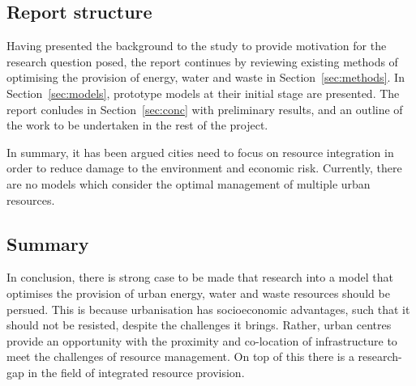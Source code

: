 \subsection{Report structure}
Having presented the background to the study to provide motivation for the research question posed, the report continues by reviewing existing methods of optimising the provision of energy, water and waste in Section~\ref{sec:methods}. In Section~\ref{sec:models}, prototype models at their initial stage are presented. The report conludes in Section~\ref{sec:conc} with preliminary results, and an outline of the work to be undertaken in the rest of the project.

In summary, it has been argued cities need to focus on resource integration in order to reduce damage to the environment and economic risk. Currently, there are no models which consider the optimal management of multiple urban resources.

\subsection{Summary}
In conclusion, there is strong case to be made that research into a model that optimises the provision of urban energy, water and waste resources should be persued. This is because urbanisation has socioeconomic advantages, such that it should not be resisted, despite the challenges it brings. Rather, urban centres provide an opportunity with the proximity and co-location of infrastructure to meet the challenges of resource management. On top of this there is a research-gap in the field of integrated resource provision.
